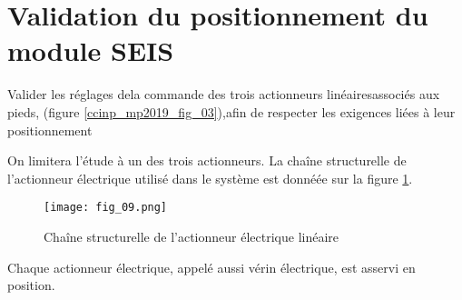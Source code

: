 \section{Validation du positionnement du module SEIS}

\begin{obj}
Valider les réglages dela commande des trois actionneurs linéairesassociés aux pieds,
 (figure \ref{ccinp_mp2019_fig_03}),afin de respecter les exigences liées à leur positionnement
\end{obj}

On limitera l’étude à un des trois actionneurs. La chaîne structurelle de l’actionneur électrique utilisé dans le système est donnéée sur la figure \ref{fig_09}.

\begin{figure}[!h]
\centering
\texttt{[image: fig\_09.png]}
\caption{Chaîne structurelle de l’actionneur électrique linéaire \label{fig_09}}
\end{figure}

 Chaque actionneur électrique, appelé aussi vérin électrique, est asservi en position.


